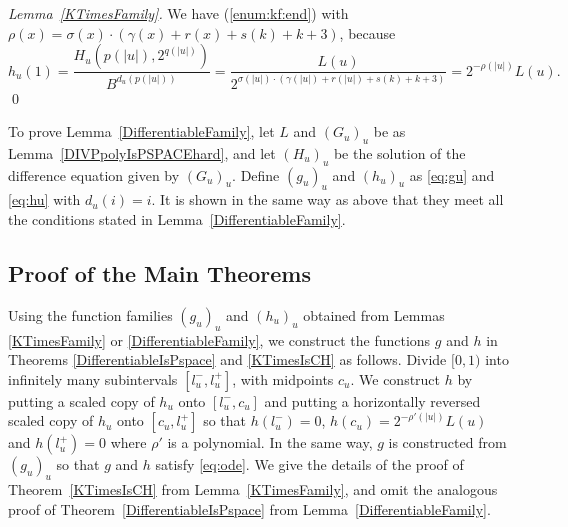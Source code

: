 \begin{proof}[Lemma~\ref{KTimesFamily}]
We have (\ref{enum:kf:end}) with
  $\rho(x) = \sigma(x) \cdot (\gamma(x)+r(x)+s(k)+k+3)$, because
  \begin{equation}
   h_u(1) = \frac{H_u(p(|u|), 2^{q(|u|)})}{B^{d_u(p(|u|))}} 
          = \frac{L(u)}{2^{\sigma(|u|) \cdot (\gamma(|u|)+r(|u|)+s(k)+k+3)}}
	  = 2^{-\rho(|u|)} L(u).
  \end{equation}
\qed
\end{proof}



 To prove Lemma~\ref{DifferentiableFamily}, 
 let $L$ and $(G_u)_u$ be as Lemma~\ref{DIVPpolyIsPSPACEhard},
 and let $(H_u)_u$ be the solution of the difference equation given by $(G_u)_u$.
 Define $(g_u)_u$ and $(h_u)_u$ as \eqref{eq:gu} and \eqref{eq:hu}
 with $d_u(i) = i$.
 It is shown in the same way as above that they meet all the conditions
 stated in Lemma~\ref{DifferentiableFamily}.



\subsection{Proof of the Main Theorems}
\label{subsection: proof of theorems}
Using the function families $(g_u)_u$ and $(h_u)_u$ 
obtained from Lemmas \ref{KTimesFamily} or \ref{DifferentiableFamily}, 
we construct the functions $g$ and $h$ in 
Theorems \ref{DifferentiableIsPspace} and \ref{KTimesIsCH} as follows. 
Divide $[0,1)$ into infinitely many subintervals $[l^-_u, l^+_u]$,
with midpoints $c_u$.
We construct $h$ by putting a scaled copy of $h_u$ onto $[l^-_u, c_u]$ and
putting a horizontally reversed scaled copy of $h_u$ onto $[c_u, l^+_u]$ 
so that $h(l^-_u) = 0$, $h(c_u) = 2^{-\rho'(|u|)} L(u)$ and $h(l^+_u) = 0$ where $\rho'$ is a polynomial.
In the same way, $g$ is constructed from $(g_u)_u$ so that $g$ and $h$ satisfy \eqref{eq:ode}.
We give the details of the proof of 
Theorem~\ref{KTimesIsCH} from Lemma~\ref{KTimesFamily}, 
and omit the analogous proof of Theorem~\ref{DifferentiableIsPspace} 
from Lemma~\ref{DifferentiableFamily}. 


